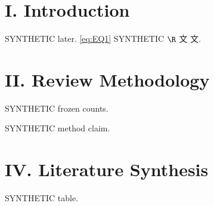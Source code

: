 \documentclass[journal]{IEEEtran}
\begin{document}
\section*{I. Introduction}

SYNTHETIC later. \eqref{eq:EQ1} \cite{Synth26} SYNTHETIC $\R$ 文 $文$. \cite{Synth226}

\section*{II. Review Methodology}

SYNTHETIC frozen counts.

SYNTHETIC method claim.

\section*{IV. Literature Synthesis}

SYNTHETIC table.
\end{document}
